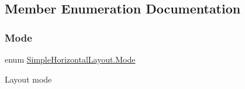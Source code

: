 \subsection{Member Enumeration Documentation}
\mbox{\label{class_simple_horizontal_layout_a84c3989f969567fef94985df15d7d03f}} 
\subsubsection{\texorpdfstring{Mode}{Mode}}
{\footnotesize\ttfamily enum \hyperlink{class_simple_horizontal_layout_a84c3989f969567fef94985df15d7d03f}{Simple\+Horizontal\+Layout.\+Mode}\hspace{0.3cm}{\ttfamily [strong]}}



Layout mode 

